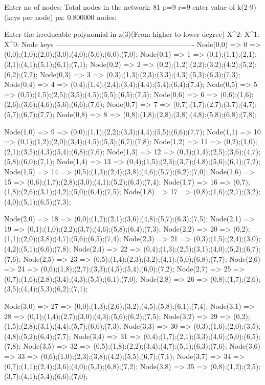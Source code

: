 Enter no of nodes:
Total nodes in the network: 81
 p=9
 r=9
enter value of k(2-9) (keys per node)
px: 0.800000
nodes: 

Enter the irreducable polynomial in z(3)(From higher to lower degree)
X^2:
X^1:
X^0:
Node                                            keys
----------------------------------------------------------
Node(0,0) => 0 => (0,0);(1,0);(2,0);(3,0);(4,0);(5,0);(6,0);(7,0);
Node(0,1) => 1 => (0,1);(1,1);(2,1);(3,1);(4,1);(5,1);(6,1);(7,1);
Node(0,2) => 2 => (0,2);(1,2);(2,2);(3,2);(4,2);(5,2);(6,2);(7,2);
Node(0,3) => 3 => (0,3);(1,3);(2,3);(3,3);(4,3);(5,3);(6,3);(7,3);
Node(0,4) => 4 => (0,4);(1,4);(2,4);(3,4);(4,4);(5,4);(6,4);(7,4);
Node(0,5) => 5 => (0,5);(1,5);(2,5);(3,5);(4,5);(5,5);(6,5);(7,5);
Node(0,6) => 6 => (0,6);(1,6);(2,6);(3,6);(4,6);(5,6);(6,6);(7,6);
Node(0,7) => 7 => (0,7);(1,7);(2,7);(3,7);(4,7);(5,7);(6,7);(7,7);
Node(0,8) => 8 => (0,8);(1,8);(2,8);(3,8);(4,8);(5,8);(6,8);(7,8);



Node(1,0) => 9 => (0,0);(1,1);(2,2);(3,3);(4,4);(5,5);(6,6);(7,7);
Node(1,1) => 10 => (0,1);(1,2);(2,0);(3,4);(4,5);(5,3);(6,7);(7,8);
Node(1,2) => 11 => (0,2);(1,0);(2,1);(3,5);(4,3);(5,4);(6,8);(7,6);
Node(1,3) => 12 => (0,3);(1,4);(2,5);(3,6);(4,7);(5,8);(6,0);(7,1);
Node(1,4) => 13 => (0,4);(1,5);(2,3);(3,7);(4,8);(5,6);(6,1);(7,2);
Node(1,5) => 14 => (0,5);(1,3);(2,4);(3,8);(4,6);(5,7);(6,2);(7,0);
Node(1,6) => 15 => (0,6);(1,7);(2,8);(3,0);(4,1);(5,2);(6,3);(7,4);
Node(1,7) => 16 => (0,7);(1,8);(2,6);(3,1);(4,2);(5,0);(6,4);(7,5);
Node(1,8) => 17 => (0,8);(1,6);(2,7);(3,2);(4,0);(5,1);(6,5);(7,3);



Node(2,0) => 18 => (0,0);(1,2);(2,1);(3,6);(4,8);(5,7);(6,3);(7,5);
Node(2,1) => 19 => (0,1);(1,0);(2,2);(3,7);(4,6);(5,8);(6,4);(7,3);
Node(2,2) => 20 => (0,2);(1,1);(2,0);(3,8);(4,7);(5,6);(6,5);(7,4);
Node(2,3) => 21 => (0,3);(1,5);(2,4);(3,0);(4,2);(5,1);(6,6);(7,8);
Node(2,4) => 22 => (0,4);(1,3);(2,5);(3,1);(4,0);(5,2);(6,7);(7,6);
Node(2,5) => 23 => (0,5);(1,4);(2,3);(3,2);(4,1);(5,0);(6,8);(7,7);
Node(2,6) => 24 => (0,6);(1,8);(2,7);(3,3);(4,5);(5,4);(6,0);(7,2);
Node(2,7) => 25 => (0,7);(1,6);(2,8);(3,4);(4,3);(5,5);(6,1);(7,0);
Node(2,8) => 26 => (0,8);(1,7);(2,6);(3,5);(4,4);(5,3);(6,2);(7,1);



Node(3,0) => 27 => (0,0);(1,3);(2,6);(3,2);(4,5);(5,8);(6,1);(7,4);
Node(3,1) => 28 => (0,1);(1,4);(2,7);(3,0);(4,3);(5,6);(6,2);(7,5);
Node(3,2) => 29 => (0,2);(1,5);(2,8);(3,1);(4,4);(5,7);(6,0);(7,3);
Node(3,3) => 30 => (0,3);(1,6);(2,0);(3,5);(4,8);(5,2);(6,4);(7,7);
Node(3,4) => 31 => (0,4);(1,7);(2,1);(3,3);(4,6);(5,0);(6,5);(7,8);
Node(3,5) => 32 => (0,5);(1,8);(2,2);(3,4);(4,7);(5,1);(6,3);(7,6);
Node(3,6) => 33 => (0,6);(1,0);(2,3);(3,8);(4,2);(5,5);(6,7);(7,1);
Node(3,7) => 34 => (0,7);(1,1);(2,4);(3,6);(4,0);(5,3);(6,8);(7,2);
Node(3,8) => 35 => (0,8);(1,2);(2,5);(3,7);(4,1);(5,4);(6,6);(7,0);



